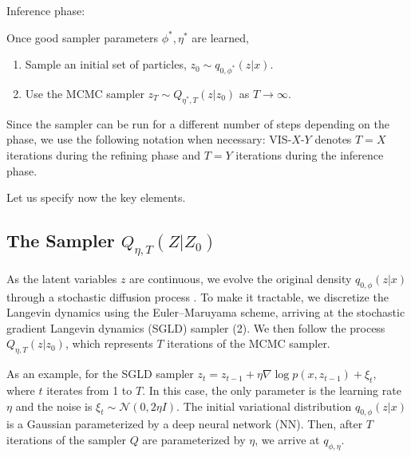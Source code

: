 Inference phase: 

Once good sampler parameters $\phi^*, \eta^*$ are learned,
    \begin{enumerate}
    \item Sample an initial set of particles, $z_0 \sim q_{0,\phi^*}(z|x)$.
    \item Use the MCMC sampler $z_T \sim Q_{\eta^*, T}(z|z_0)$ as $T \rightarrow \infty$.
    \end{enumerate}


 Since the sampler can be run for a different number of steps depending on the phase, we use the following notation when necessary: VIS-$X$-$Y$ denotes $T = X$ iterations during the refining phase and $T=Y$ iterations during the inference phase.


Let us specify now the key elements.

\subsection{The Sampler $Q_{ \eta, T}(Z|Z_0)$ } \label{sec:grad}

{ As the latent variables $z$ are continuous}, %
we evolve the original density $q_{0,\phi}(z|x)$ through a stochastic diffusion process \cite{pavliotis2014stochastic}. To make it tractable, we discretize the Langevin dynamics using the Euler--Maruyama scheme, arriving at the stochastic gradient Langevin dynamics (SGLD) sampler (2). %
We then follow the process $Q_{\eta,T} (z | z_0)$,
which represents $T$ iterations of the MCMC sampler. 

As an example, for the SGLD sampler $z_t = z_{t-1} + \eta \nabla \log p(x, z_{t-1}) + \xi_{t},$ where $t$ iterates from 1 to $T$. In this case, the only parameter
is the learning rate $\eta$ and the noise is $\xi_t \sim \mathcal{N}(0, 2\eta I)$. %
The initial variational distribution $q_{0, \phi}(z|x)$ is a Gaussian parameterized by a deep neural network (NN). Then, after $T$ iterations of the sampler $Q$ are parameterized by $\eta$, we arrive at $q_{\phi, \eta}$. 

